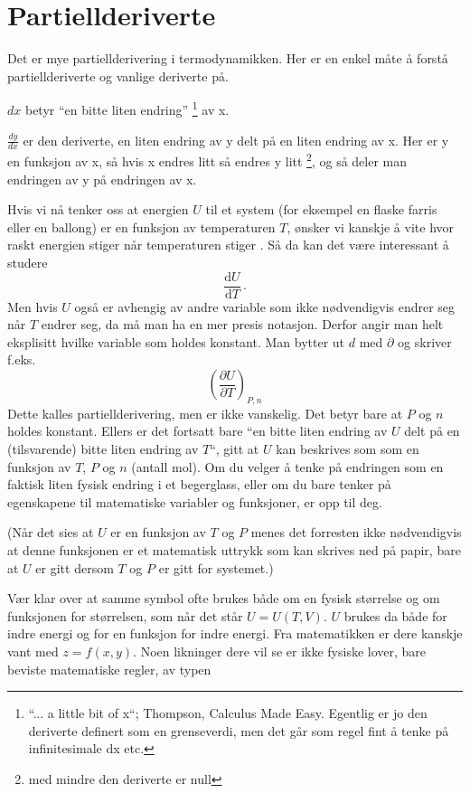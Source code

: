 \documentclass[11pt, A4paper]{article}
\begin{document}
\section{Partiellderiverte}
Det er mye partiellderivering i termodynamikken. Her er en enkel måte å forstå partiellderiverte og vanlige deriverte på. 

$dx$ betyr ``en bitte liten endring'' \footnote{``... a little bit of x``; Thompson, Calculus Made Easy. Egentlig er jo den deriverte definert som en grenseverdi, men det går som regel fint å tenke på infinitesimale dx etc.} av x.

$\frac{dy}{dx}$ er den deriverte, en liten endring av y delt på en
liten endring av x. Her er y en funksjon av x, så hvis x endres
litt så endres y litt \footnote{med mindre den deriverte er null}, og så deler man endringen av y på endringen av x. 

Hvis vi nå tenker oss at energien $U$ til et system (for eksempel en flaske farris
eller en ballong) er en funksjon av temperaturen $T$, ønsker vi kanskje å vite
hvor raskt energien stiger når temperaturen stiger . Så da kan
det være interessant å studere
\begin{equation*}
\label{eq:16}
\frac{\mathrm{d}U}{\mathrm{d}T}\,.
\end{equation*}
Men hvis $U$ også er avhengig av andre variable som ikke nødvendigvis endrer seg når $T$ endrer seg, da må man ha en mer presis notasjon. Derfor  angir man helt
eksplisitt hvilke variable som holdes konstant. Man bytter ut $d$ med
$\partial$ og skriver f.eks.
\begin{equation*}
\label{eq:1}
\left(\frac{\partial U}{\partial T}\right)_{P,n}
\end{equation*}
Dette kalles partiellderivering, men er ikke vanskelig. Det betyr bare at $P$ og $n$ holdes konstant. Ellers er det fortsatt bare
``en bitte liten endring av $U$ delt på en (tilsvarende) bitte liten
endring av $T$``, gitt at $U$ kan beskrives som som en funksjon av
$T$, $P$ og $n$ (antall mol). Om du velger å tenke på endringen som en
faktisk liten fysisk endring i et begerglass, eller om du bare tenker
på egenskapene til matematiske variabler og funksjoner, er opp til
deg.

(Når det sies at $U$ er en funksjon av $T$ og $P$
menes det forresten ikke nødvendigvis at denne funksjonen er et matematisk uttrykk
som kan skrives ned på papir, bare at $U$ er gitt dersom $T$ og $P$
er gitt for systemet.)

Vær klar over at samme symbol ofte brukes både om en fysisk størrelse
og om funksjonen for størrelsen, som når det står $U = U(T, V)$. $U$
brukes da både for indre energi og for en funksjon for indre
energi. Fra matematikken er dere kanskje vant med $z = f(x, y)$. Noen
likninger dere vil se er ikke fysiske lover, bare beviste matematiske
regler, av typen
\end{document}
